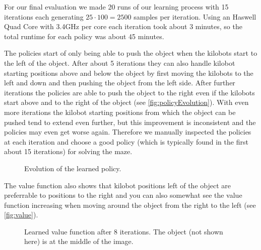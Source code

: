 \documentclass[twoside]{article}
\begin{document}
For our final evaluation we made 20 runs of our learning process with 15
iterations each generating $25 \cdot 100 = 2500$ samples per iteration. Using
an Haswell Quad Core with 3.4GHz per core each iteration took about 3 minutes,
so the total runtime for each policy was about 45 minutes.

The policies start of only being able to push the object when the kilobots start
to the left of the object. After about 5 iterations they can also handle kilobot
starting positions above and below the object by first moving the kilobots to
the left and down and then pushing the object from the left side. After further
iterations the policies are able to push the object to the right even if the
kilobots start above and to the right of the object (see
\autoref{fig:policyEvolution}). With even more iterations the kilobot starting
positions from which the object can be pushed tend to extend even further, but
this improvement is inconsistent and the policies may even get worse again.
Therefore we manually inspected the policies at each iteration and choose a good
policy (which is typically found in the first about 15 iterations) for solving
the maze.

\begin{figure}[!htb]
	\centering
    \hfill
    \hfill
    \hfill
    \hfill
	\caption[foo]{Evolution of the learned policy.}
	\label{fig:policyEvolution}
\end{figure}

The value function also shows that kilobot positions left of the object are
preferrable to positions to the right and you can also somewhat see the value
function increasing when moving around the object from the right to the left
(see \autoref{fig:value}).

\begin{figure}[!htb]
	\centering
    \def\svgwidth{\columnwidth}
    
    \caption{Learned value function after 8 iterations. The object (not shown
             here) is at the middle of the image.}
	\label{fig:value}
\end{figure}
\end{document}

